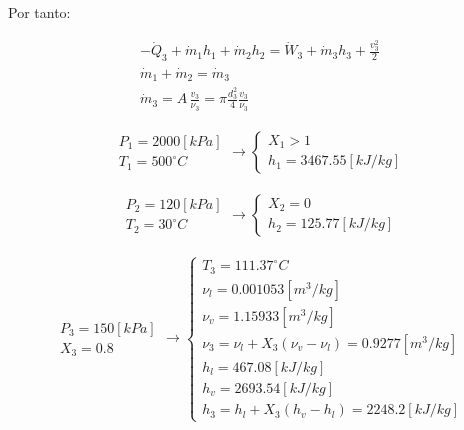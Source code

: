 \documentclass[letter,10pt]{article}
\begin{document}
\begin{enumerate}
Por tanto:

\begin{eqnarray*}
    -\dot{Q}_3 + \dot{m}_1 h_1 + \dot{m}_2 h_2
    = \dot{W}_3 + \dot{m}_3 h_3 + \frac{v^2_3}{2} \\
    \dot{m}_1 + \dot{m}_2 = \dot{m}_3 \\
    \dot{m}_3 = A\,\frac{v_3}{\nu_3} = \pi\frac{d^2_3}{4}\frac{v_3}{\nu_3}
\end{eqnarray*}

\begin{eqnarray*}
    \begin{array}{c}
        P_1 = 2000[kPa] \\
        T_1 = 500^\circ C
    \end{array}
    \rightarrow
    \begin{cases}
        X_1 > 1 \\
        h_1 = 3467.55[kJ/kg]
    \end{cases}
\end{eqnarray*}

\begin{eqnarray*}
    \begin{array}{c}
        P_2 = 120[kPa] \\
        T_2 = 30^\circ C
    \end{array}
    \rightarrow
    \begin{cases}
        X_2 = 0 \\
        h_2 = 125.77[kJ/kg]
    \end{cases}
\end{eqnarray*}

\begin{eqnarray*}
    \begin{array}{c}
        P_3 = 150[kPa] \\
        X_3 = 0.8
    \end{array}
    \rightarrow
    \begin{cases}
        T_3 = 111.37^\circ C \\
        \nu_l = 0.001053[m^3/kg] \\
        \nu_v = 1.15933[m^3/kg] \\
        \nu_3 = \nu_l + X_3 (\nu_v - \nu_l) = 0.9277[m^3/kg] \\
        h_l = 467.08[kJ/kg] \\
        h_v = 2693.54[kJ/kg] \\
        h_3 = h_l + X_3 (h_v - h_l) = 2248.2[kJ/kg]
    \end{cases}
\end{eqnarray*}


\end{enumerate}
\end{document}
